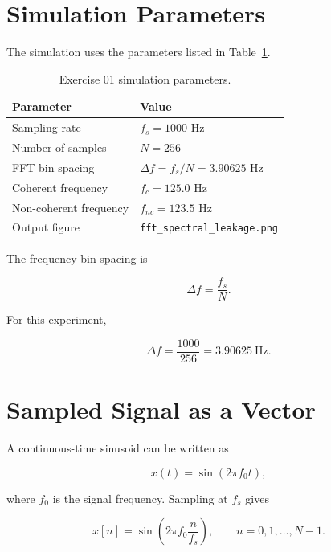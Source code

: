 ﻿\documentclass[11pt]{article}
\begin{document}
\section{Simulation Parameters}

The simulation uses the parameters listed in Table~\ref{tab:sim_params}.

\begin{table}[htbp]
\centering
\caption{Exercise 01 simulation parameters.}
\label{tab:sim_params}
\begin{tabular}{ll}
\toprule
Parameter & Value \\
\midrule
Sampling rate & $f_s = 1000$ Hz \\
Number of samples & $N = 256$ \\
FFT bin spacing & $\Delta f = f_s/N = 3.90625$ Hz \\
Coherent frequency & $f_c = 125.0$ Hz \\
Non-coherent frequency & $f_{nc} = 123.5$ Hz \\
Output figure & \texttt{fft\_spectral\_leakage.png} \\
\bottomrule
\end{tabular}
\end{table}

The frequency-bin spacing is

\begin{equation}
\Delta f = \frac{f_s}{N}.
\end{equation}

For this experiment,

\begin{equation}
\Delta f = \frac{1000}{256} = 3.90625~\text{Hz}.
\end{equation}

\section{Sampled Signal as a Vector}

A continuous-time sinusoid can be written as

\begin{equation}
x(t) = \sin(2\pi f_0 t),
\end{equation}

where $f_0$ is the signal frequency. Sampling at $f_s$ gives

\begin{equation}
x[n] = \sin\left(2\pi f_0 \frac{n}{f_s}\right), \qquad n = 0,1,\ldots,N-1.
\end{equation}
\end{document}
